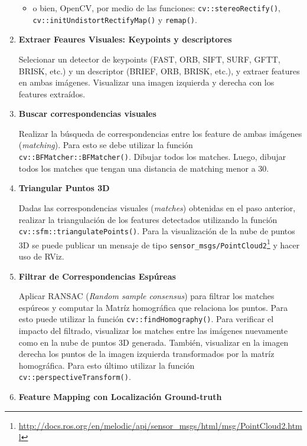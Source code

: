 \documentclass[tp]{lcc}
\begin{document}
\begin{enumerate}
\begin{itemize}
        
        \item o bien, OpenCV, por medio de las funciones: \lstinline{cv::stereoRectify()},  \lstinline{cv::initUndistortRectifyMap()} y  \lstinline{remap()}.
        
    \end{itemize}

\item \textbf{Extraer Feaures Visuales: Keypoints y descriptores}

Selecionar un detector de keypoints (FAST, ORB, SIFT, SURF, GFTT, BRISK, etc.) y un descriptor (BRIEF, ORB, BRISK, etc.), y extraer features en ambas imágenes. Visualizar una imagen izquierda y derecha con los features extraídos.

\item \textbf{Buscar correspondencias visuales}

Realizar la búsqueda de correspondencias entre los feature de ambas imágenes (\emph{matching}). Para esto se debe utilizar la función \lstinline{cv::BFMatcher::BFMatcher()}. Dibujar todos los matches. Luego, dibujar todos los matches que tengan una distancia de matching menor a 30.

\item \textbf{Triangular Puntos 3D}

Dadas las correspondencias visuales (\emph{matches}) obtenidas en el paso anterior, realizar la triangulación de los features detectados utilizando la función \lstinline{cv::sfm::triangulatePoints()}. Para la visualización de la nube de puntos 3D se puede publicar un mensaje de tipo \lstinline{sensor_msgs/PointCloud2}\footnote{\url{http://docs.ros.org/en/melodic/api/sensor_msgs/html/msg/PointCloud2.html}} y hacer uso de RViz.

\item \textbf{Filtrar de Correspondencias Espúreas}

Aplicar RANSAC (\emph{Random sample consensus}) para filtrar los matches espúreos y computar la Matríz homográfica que relaciona los puntos. Para esto puede utilizar la función \lstinline{cv::findHomography()}. Para verificar el impacto del filtrado, visualizar los matches entre las imágenes nuevamente como en la nube de puntos 3D generada. También, visualizar en la imagen derecha los puntos de la imagen izquierda transformados por la matríz homográfica. Para esto último utilizar la función  \lstinline{cv::perspectiveTransform()}.

\item \textbf{Feature Mapping con Localización Ground-truth}


\end{enumerate}
\end{document}
